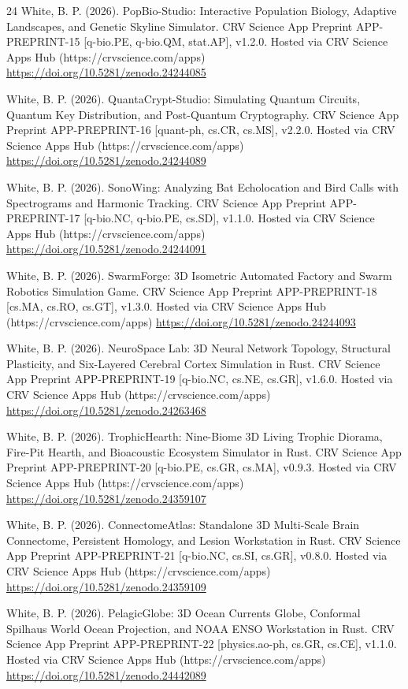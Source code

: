 \documentclass[10pt,letterpaper]{article}
\begin{document}
\begin{thebibliography}{24}
 White, B. P. (2026). PopBio-Studio: Interactive Population Biology, Adaptive Landscapes, and Genetic Skyline Simulator. CRV Science App Preprint APP-PREPRINT-15 [q-bio.PE, q-bio.QM, stat.AP], v1.2.0. Hosted via CRV Science Apps Hub (https://crvscience.com/apps) \url{https://doi.org/10.5281/zenodo.24244085}

 White, B. P. (2026). QuantaCrypt-Studio: Simulating Quantum Circuits, Quantum Key Distribution, and Post-Quantum Cryptography. CRV Science App Preprint APP-PREPRINT-16 [quant-ph, cs.CR, cs.MS], v2.2.0. Hosted via CRV Science Apps Hub (https://crvscience.com/apps) \url{https://doi.org/10.5281/zenodo.24244089}

 White, B. P. (2026). SonoWing: Analyzing Bat Echolocation and Bird Calls with Spectrograms and Harmonic Tracking. CRV Science App Preprint APP-PREPRINT-17 [q-bio.NC, q-bio.PE, cs.SD], v1.1.0. Hosted via CRV Science Apps Hub (https://crvscience.com/apps) \url{https://doi.org/10.5281/zenodo.24244091}

 White, B. P. (2026). SwarmForge: 3D Isometric Automated Factory and Swarm Robotics Simulation Game. CRV Science App Preprint APP-PREPRINT-18 [cs.MA, cs.RO, cs.GT], v1.3.0. Hosted via CRV Science Apps Hub (https://crvscience.com/apps) \url{https://doi.org/10.5281/zenodo.24244093}

 White, B. P. (2026). NeuroSpace Lab: 3D Neural Network Topology, Structural Plasticity, and Six-Layered Cerebral Cortex Simulation in Rust. CRV Science App Preprint APP-PREPRINT-19 [q-bio.NC, cs.NE, cs.GR], v1.6.0. Hosted via CRV Science Apps Hub (https://crvscience.com/apps) \url{https://doi.org/10.5281/zenodo.24263468}

 White, B. P. (2026). TrophicHearth: Nine-Biome 3D Living Trophic Diorama, Fire-Pit Hearth, and Bioacoustic Ecosystem Simulator in Rust. CRV Science App Preprint APP-PREPRINT-20 [q-bio.PE, cs.GR, cs.MA], v0.9.3. Hosted via CRV Science Apps Hub (https://crvscience.com/apps) \url{https://doi.org/10.5281/zenodo.24359107}

 White, B. P. (2026). ConnectomeAtlas: Standalone 3D Multi-Scale Brain Connectome, Persistent Homology, and Lesion Workstation in Rust. CRV Science App Preprint APP-PREPRINT-21 [q-bio.NC, cs.SI, cs.GR], v0.8.0. Hosted via CRV Science Apps Hub (https://crvscience.com/apps) \url{https://doi.org/10.5281/zenodo.24359109}

 White, B. P. (2026). PelagicGlobe: 3D Ocean Currents Globe, Conformal Spilhaus World Ocean Projection, and NOAA ENSO Workstation in Rust. CRV Science App Preprint APP-PREPRINT-22 [physics.ao-ph, cs.GR, cs.CE], v1.1.0. Hosted via CRV Science Apps Hub (https://crvscience.com/apps) \url{https://doi.org/10.5281/zenodo.24442089}


\end{thebibliography}
\end{document}
